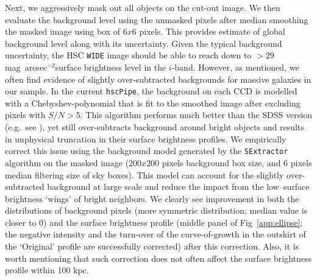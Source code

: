 \documentclass[fleqn,usenatbib]{mnras}
\def\sb{mag~arcsec$^{-2}$}
\begin{document}
    Next, we aggressively mask out all objects on the cut-out image.  
    We then evaluate the background level using the unmasked pixels after median 
    smoothing the masked image using box of $6x6$ pixels.
    This provides estimate of global background level along with its uncertainty. 
    Given the typical background uncertainty, the HSC \texttt{WIDE} image should be 
    able to reach down to $> 29$ \sb surface brightness level in the $i$-band.  
    However, as mentioned, we often find evidence of slightly over-subtracted 
    backgrounds for massive galaxies in our sample. 
    In the current \texttt{hscPipe}, the background on each CCD is modelled with a 
    Chebyshev-polynomial that is fit to the smoothed image after excluding pixels 
    with $S/N >5$.
    This algorithm performs much better than the SDSS version 
    (e.g.\ see \citealt{Blanton2011}), yet still over-subtracts background around 
    bright objects and results in unphysical truncation in their surface brightness 
    profiles.
    We empirically correct this issue using the background model generated by 
    the \texttt{SExtractor} algorithm on the masked image 
    ($200x200$ pixels background box size, and 6 pixels median filtering size of 
    sky boxes).
    This model can account for the slightly over-subtracted background at large 
    scale and reduce the impact from the low--surface brightness `wings' of bright 
    neighbors. 
    We clearly see improvement in both the distributions of background pixels 
    (more symmetric distribution; median value is closer to 0) and the surface 
    brightness profile (middle panel of Fig~\ref{app:ellipse}; the negative 
    intensity and the turn-over of the curve-of-growth in the outskirt of the 
    `Original' profile are successfully corrected) after this correction.
    Also, it is worth mentioning that such correction does not often affect the 
    surface brightness profile within 100 kpc. 
    
\end{document}
